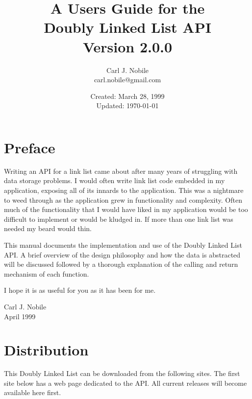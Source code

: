 \documentclass[10pt,letterpaper,titlepage]{article}
\begin{document}
\title{A Users Guide for the\\
       Doubly Linked List API\\
       Version 2.0.0}
\author{Carl J. Nobile\\
	carl.nobile@gmail.com}
\date{Created: March 28, 1999\\
	Updated: \today}
\maketitle

\section*{Preface}
Writing an API for a link list came about after many years of struggling with data storage problems.  I would often write link list code embedded in my application, exposing all of its innards to the application.  This was a nightmare to weed through as the application grew in functionality and complexity.  Often much of the functionality that I would have liked in my application would be too difficult to implement or would be kludged in.  If more than one link list was needed my beard would thin.
\vspace{8pt}

\noindent
This manual documents the implementation and use of the Doubly Linked List API.  A brief overview of the design philosophy and how the data is abstracted will be discussed followed by a thorough explanation of the calling and return mechanism of each function.
\vspace{8pt}

\noindent
I hope it is as useful for you as it has been for me.
\vspace{8pt}
\begin{flushright}
Carl J. Nobile\\
April 1999
\end{flushright}
\newpage

\tableofcontents
\newpage

\section{Distribution}
This Doubly Linked List can be downloaded from the following sites.  The first site below has a web page dedicated to the API.  All current releases will become available here first.
\vspace{8pt}
\end{document}
